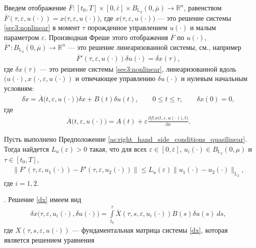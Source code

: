 \documentclass[../main.tex]{subfiles}
\begin{document}
Введем отображение $\overline{F}: [t_0,T] \times [0,\overline{\varepsilon}] \times B_{\mathbb{L}_2}(0,\overline{\mu}) \to \mathbb{R}^n$, равенством $\overline{F}(\tau,\varepsilon, u(\cdot)) = x \big(\tau,\varepsilon, u(\cdot)\big) $, где $x \big(\tau,\varepsilon, u(\cdot)\big)$ --- это решение системы \eqref{sec3:nonlinear} в момент $\tau$ порожденное управлением $u(\cdot)$ и малым параметром  $\varepsilon$.  Производная Фреше этого отображения $\overline{F}$ по $u(\cdot)$, $\overline{F}': B_{\mathbb{L}_2}(0,\overline{\mu}) \to \mathbb{R}^n $ --- это решение линеаризованной системы, см., например \cite{GusZyk}
\begin{gather}\label{dF}
    \overline{F}'(\tau,\varepsilon, u(\cdot)) \delta u(\cdot) = \delta x(\tau), 
\end{gather}
где $\delta x(\tau)$ --- это решение системы \eqref{sec3:nonlinear}, линеаризованной вдоль $(u(\cdot),x(\cdot,\varepsilon, u(\cdot))$ и отвечающее управлению $\delta u(\cdot)$ и нулевым начальным условиям:
\begin{gather}\label{dx}
    \delta\dot{x} =   \overline{A}\big(t,\varepsilon,u(\cdot)\big) \delta x +  B(t)\delta u(t), \qquad 0\leqslant t \leqslant \tau, \qquad \delta x(0) = 0,
\end{gather}
где
\begin{gather*}
    \overline{A}\big(t,\varepsilon,u(\cdot)\big) = A(t) +\varepsilon \frac{\partial f\big(x(t,\varepsilon,u(\cdot)\big),t\big)}{\partial x}.
\end{gather*}
\begin{lemma}\label{lem:Lipdx}
    Пусть выполнено Предположение \ref{as:right_hand_side_conditions_quasilinear}.  Тогда найдется  $L_u(\varepsilon) > 0$ такая, что для всех $\varepsilon\in [0,\overline{\varepsilon}]$, $u_i(\cdot) \in B_{\mathbb{L}_2}(0,\mu)$ и $\tau \in [t_0,T]$, 
    \begin{gather*}
        \| \overline{F}'(\tau,\varepsilon, u_1(\cdot)) - \overline{F}'(\tau,\varepsilon, u_2(\cdot)) \| \leqslant L_u(\varepsilon) \| u_1(\cdot) - u_2(\cdot) \|_{\mathbb{L}_2},
    \end{gather*}
    где $i = 1,2$.
\end{lemma}
\doc. 
Решение \eqref{dx} имеем вид
\begin{gather}\label{xu}
    \delta x\big(\tau,\varepsilon,u_i(\cdot),\delta u(\cdot)\big) = \int\limits_{t_0}^{\tau}  \overline{X}(\tau,s,\varepsilon,u_i(\cdot)) B(s) \delta u(s) \ ds,
\end{gather}
где $X(\tau,s,\varepsilon,u(\cdot)) $ --- фундаментальная матрица системы \eqref{dx}, которая является решением уравнения
\end{document}
